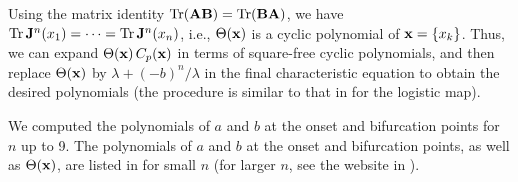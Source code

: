 \documentclass[twocolumn]{revtex4-1}
\begin{document}
Using the matrix identity $\mathrm{Tr}( \mathbf{A} \mathbf{B}) = \mathrm{Tr}(\mathbf{B} \mathbf{A})$,
  we have
    $\mathrm{Tr} \, \mathbf{J}^n(x_1) = \cdots = \mathrm{Tr} \, \mathbf{J}^n(x_n)$,
i.e., $\Theta(\mathbf{x})$ is a cyclic polynomial of $\mathbf{x} = \{ x_k \}$.
%
Thus, we can expand $\Theta(\mathbf{x}) \, C_p(\mathbf{x})$
  in terms of square-free cyclic polynomials,
  and then replace $\Theta(\mathbf{x})$ by $\lambda + (-b)^n/\lambda$
  in the final characteristic equation to obtain the desired polynomials
  (the procedure is similar to that in  for the logistic map).
%
%
%

We computed the polynomials of $a$ and $b$
  at the onset and bifurcation points for $n$ up to 9.
The polynomials of $a$ and $b$
  at the onset and bifurcation points,
  as well as $\Theta(\mathbf{x})$,
  are listed in  for small $n$
(for larger $n$, see the website in ).









\newcommand{\BB}[2]{B^{(2)}_{#1,#2}}
\newcommand{\BBB}[3]{B^{(4)}_{#1,#2,#3}}
\newcommand{\BBBB}[4]{B^{(6)}_{#1,#2,#3,#4}}
\end{document}
